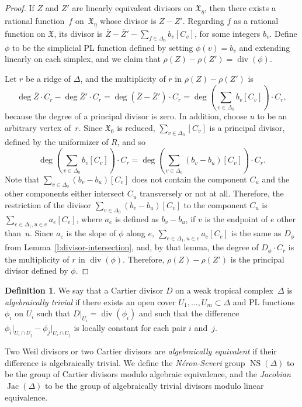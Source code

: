 \documentclass[11pt,reqno]{amsart}
\theoremstyle{definition}
\newtheorem{defn}[thm]{Definition}
\newcommand{\defi}[1]{\emph{#1}}
\renewcommand{\div}{\operatorname{div}}
\newcommand{\Jac}{\operatorname{Jac}}
\newcommand{\NS}{\operatorname{NS}}
\newcommand{\X}{\mathfrak X}
\begin{document}
\begin{proof}
If $Z$ and $Z'$ are linearly equivalent divisors on $\X_\eta$, then there exists
a rational function~$f$ on~$\X_\eta$ whose divisor is $Z - Z'$. Regarding $f$ as
a rational function on $\X$, its divisor is $\overline Z - \overline Z' -
\sum_{f \in \Delta_0} b_v [C_v]$, for some integers $b_v$. Define $\phi$ to be
the simplicial PL function defined by setting $\phi(v) = b_v$ and extending
linearly on each simplex, and we claim that $\rho(Z) - \rho(Z') = \div(\phi)$.

Let $r$ be a ridge of $\Delta$, and the multiplicity of $r$ in $\rho(Z) -
\rho(Z')$ is
\begin{equation*}
\deg\overline Z \cdot C_r - \deg\overline Z' \cdot C_r =
\deg(\overline Z - \overline Z') \cdot C_r =
\deg \left(\sum_{v \in \Delta_0} b_v [C_v]\right) \cdot C_r,
\end{equation*}
because the degree of a principal divisor is zero. In addition, choose $u$ to be
an arbitrary vertex of~$r$. Since $\X_0$ is reduced, $\sum_{v \in \Delta_0}
[C_v]$ is a principal divisor, defined by the uniformizer of $R$, and so
\begin{equation*}
\deg \left(\sum_{v \in \Delta_0} b_v [C_v] \right) \cdot C_r =
\deg \left(\sum_{v \in \Delta_0} (b_v - b_u)[C_v]\right) \cdot C_r.
\end{equation*}
Note that $\sum_{v \in \Delta_0} (b_v - b_u) [C_v]$ does not contain the
component $C_u$ and the other components either intersect $C_u$ transversely or
not at all. Therefore, the restriction of the divisor $\sum_{v \in \Delta_0}
(b_v - b_u) [C_v]$ to the component $C_u$ is $\sum_{e \in \Delta_1, u \in e} a_e
[C_e]$, where $a_e$ is defined as $b_v - b_u$, if $v$ is the endpoint of
$e$ other than~$u$. Since $a_e$ is the slope of $\phi$ along $e$, $\sum_{e \in
\Delta_1, u \in e} a_e [C_e]$ is the same as $D_\phi$ from
Lemma~\ref{l:divisor-intersection}, and, by that lemma, the degree of $D_\phi
\cdot C_r$ is the multiplicity of $r$ in $\div(\phi)$. Therefore, $\rho(Z) -
\rho(Z')$ is the principal divisor defined by $\phi$.
\end{proof}

\begin{defn}\label{d:alg-trivial-equiv}
We say that a Cartier divisor $D$ on a weak tropical complex~$\Delta$ is
\defi{algebraically trivial} if there exists an open cover $U_1, \ldots, U_m
\subset \Delta$ and PL functions~$\phi_i$ on $U_i$ such that $D \vert_{U_i} =
\div(\phi_i)$ and such that the difference $\phi_i\vert_{U_i \cap U_j} - \phi_j
\vert_{U_i \cap U_j}$ is locally constant for each pair $i$ and~$j$.

Two Weil divisors or two Cartier divisors are \defi{algebraically equivalent} if
their difference is algebraically trivial. We define the \defi{N\'eron-Severi}
group $\NS(\Delta)$ to be the group of Cartier divisors modulo algebraic
equivalence, and the \defi{Jacobian} $\Jac(\Delta)$ to be the group of
algebraically trivial divisors modulo linear equivalence.
\end{defn}
\end{document}
